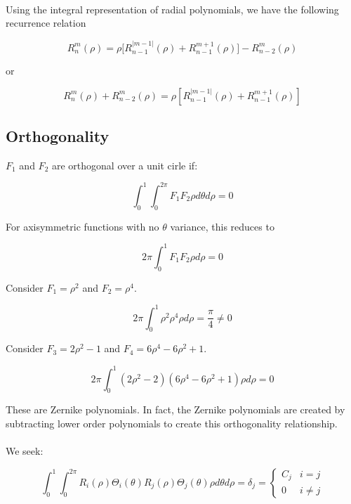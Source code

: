 \documentclass{tufte-handout}
\begin{document}
\paragraph{}Using the integral representation of radial polynomials, we have the following recurrence relation

\begin{equation}
R_n^m(\rho)=\rho\Big[R_{n-1}^{|m-1|}(\rho)+R_{n-1}^{m+1}(\rho)\Big]-R_{n-2}^m(
\rho)
\end{equation}

or


\begin{equation}
R_n^m(\rho)+R_{n-2}^m(\rho)=\rho\left[R_{n-1}^{\left|m-1\right|}(\rho)+R_{n-1}^
{m+1}(\rho)\right]
\end{equation}

\subsection{Orthogonality}
 $F_1$ and $F_2$ are orthogonal over a unit cirle if:

$$\int_0^1\int_0^{2\pi} F_1F_2\rho d\theta d\rho = 0$$

For axisymmetric functions with no $\theta$ variance, this reduces to

$$2\pi \int_0^1 F_1F_2 \rho d\rho = 0$$

Consider $F_1=\rho^2$ and $F_2=\rho^4$.

$$2\pi\int_0^1 \rho^2 \rho^4\rho  d\rho = \frac{\pi}{4}\neq 0$$

Consider $F_3=2\rho^2-1$ and $F_4=6\rho^4-6\rho^2+1$.

$$2\pi\int_0^1 (2\rho^2-2)(6 \rho^4-6\rho^2+1)\rho  d\rho = 0$$

These are Zernike polynomials.  In fact, the Zernike polynomials are created by
subtracting lower order polynomials to create this orthogonality relationship.

\paragraph{}We seek:

$$\int_0^1\int_0^{2\pi} R_i(\rho)\Theta_i(\theta)R_j(\rho)\Theta_j(\theta)\rho
d\theta d\rho = \delta_j=\left\{
     \begin{array}{lr}
        C_j&  i=j\\
       0 & i\neq j
     \end{array}
   \right.$$
\end{document}
